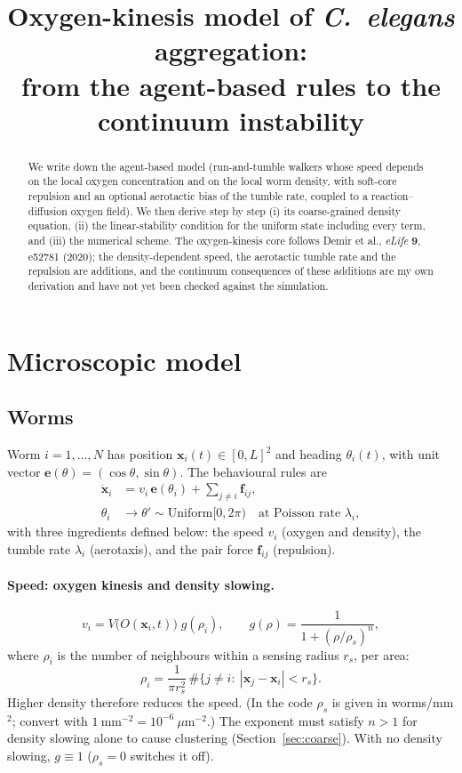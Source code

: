\documentclass[11pt,a4paper]{article}
\title{Oxygen-kinesis model of \textit{C.\ elegans} aggregation:\\
from the agent-based rules to the continuum instability}
\author{}
\date{}
\newcommand{\vect}[1]{\bm{#1}}
\begin{document}
\maketitle

\begin{abstract}
\noindent
We write down the agent-based model (run-and-tumble walkers whose speed depends on the local oxygen concentration and on the local worm density, with soft-core repulsion and an optional aerotactic bias of the tumble rate, coupled to a reaction--diffusion oxygen field). We then derive step by step (i) its coarse-grained density equation, (ii) the linear-stability condition for the uniform state including every term, and (iii) the numerical scheme. The oxygen-kinesis core follows Demir et al., \textit{eLife} \textbf{9}, e52781 (2020); the density-dependent speed, the aerotactic tumble rate and the repulsion are additions, and the continuum consequences of these additions are my own derivation and have not yet been checked against the simulation.
\end{abstract}

\section{Microscopic model}

\subsection{Worms}
Worm $i=1,\dots,N$ has position $\vect{x}_i(t)\in[0,L]^2$ and heading $\theta_i(t)$, with unit vector $\vect{e}(\theta)=(\cos\theta,\sin\theta)$. The behavioural rules are
\begin{align}
\dot{\vect{x}}_i &= v_i\,\vect{e}(\theta_i)+\sum_{j\neq i}\vect{f}_{ij}, \label{eq:motion}\\
\theta_i &\to \theta'\sim\mathrm{Uniform}[0,2\pi)\quad\text{at Poisson rate }\lambda_i, \label{eq:tumble}
\end{align}
with three ingredients defined below: the speed $v_i$ (oxygen and density), the tumble rate $\lambda_i$ (aerotaxis), and the pair force $\vect{f}_{ij}$ (repulsion).

\paragraph{Speed: oxygen kinesis and density slowing.}
\begin{equation}
v_i = V\!\big(O(\vect{x}_i,t)\big)\;g(\rho_i),
\qquad
g(\rho)=\frac{1}{1+(\rho/\rho_s)^{n}},
\label{eq:speed}
\end{equation}
where $\rho_i$ is the number of neighbours within a sensing radius $r_s$, per area:
\begin{equation}
\rho_i=\frac{1}{\pi r_s^2}\,\#\{j\neq i:\ |\vect{x}_j-\vect{x}_i|<r_s\}.
\label{eq:rhoi}
\end{equation}
Higher density therefore reduces the speed. (In the code $\rho_s$ is given in worms/mm$^2$; convert with $1~\mathrm{mm}^{-2}=10^{-6}~\mu\mathrm{m}^{-2}$.) The exponent must satisfy $n>1$ for density slowing alone to cause clustering (Section~\ref{sec:coarse}). With no density slowing, $g\equiv1$ ($\rho_s=0$ switches it off).
\end{document}

